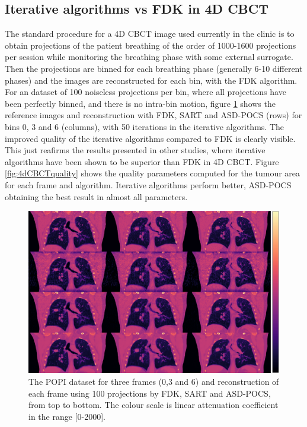 \subsection{Iterative algorithms vs FDK in 4D CBCT}
The standard procedure for a 4D CBCT image used currently in the clinic is to obtain projections of the patient breathing of the order of 1000-1600\cite{thengumpallil2016difference} projections per session while monitoring the breathing phase with some external surrogate. Then the projections are binned for each breathing phase (generally 6-10 different phases) and the images are reconstructed for each bin, with the FDK algorithm. For an dataset of 100 noiseless projections per bin, where all projections have been perfectly binned, and there is no intra-bin motion, figure \ref{fig:4dCBCT3static} shows the reference images and reconstruction with FDK, SART and ASD-POCS (rows) for bins 0, 3 and 6 (columns), with 50 iterations in the iterative algorithms. The improved quality of the iterative algorithms compared to FDK is clearly visible. This just reafirms the results presented in other studies\cite{schmidt2014clinical}\cite{shieh2014image}, where iterative algorithms have been shown to be superior than FDK in 4D CBCT. Figure \ref{fig:4dCBCTquality} shows the quality parameters computed for the tumour area for each frame and algorithm. Iterative algorithms perform better, ASD-POCS obtaining the best result in almost all parameters.
 
\begin{figure}
\begin{center}

\includegraphics[width=\textwidth]{accuracyMC/4DCBCT3stage.png} 


\end{center}

\caption[Three frames of the 4D CBCT recosntruction with different algorithm]{\label{fig:4dCBCT3static} The POPI dataset for three frames (0,3 and 6) and reconstruction of each frame using 100 projections by FDK, SART and ASD-POCS, from top to bottom.  The colour scale is linear attenuation coefficient in the range [0-2000].} 
\end{figure}

